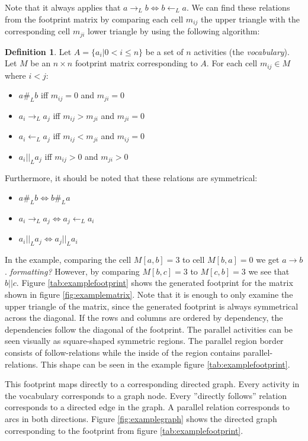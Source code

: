 \documentclass[english,12pt,a4paper,pdftex,sci,utf8]{aaltothesis}
\theoremstyle{definition}
\newtheorem{definition}{Definition}
\newcommand{\nyi}[1]{\noindent\colorbox{nyibg}{\textcolor{nyitext}{\emph{#1}}}}
\begin{document}
Note that it always applies that $a \rightarrow_L b \Leftrightarrow b \leftarrow_L a$.
We can find these relations from the footprint matrix by comparing each cell $m_{ij}$ the upper triangle with the corresponding cell $m_{ji}$ lower triangle by using the following algorithm:

\begin{definition}
Let $A = \{ a_i | 0 < i \le n \}$ be a set of $n$ activities (the \emph{vocabulary}).
Let $M$ be an $n \times n$ footprint matrix corresponding to $A$.
For each cell $m_{ij} \in M$ where $i < j$:
\begin{itemize}
    \item $a \#_L b$ iff $m_{ij} = 0$ and $m_{ji} = 0$
    \item $a_i \rightarrow_L a_j$ iff $m_{ij} > m_{ji}$ and $m_{ji} = 0$
    \item $a_i \leftarrow_L a_j$ iff $m_{ij} < m_{ji}$ and $m_{ij} = 0$
    \item $a_i ||_L a_j$ iff $m_{ij} > 0$ and $m_{ji} > 0$
\end{itemize}
Furthermore, it should be noted that these relations are symmetrical:
\begin{itemize}
    \item $a \#_L b \Leftrightarrow b \#_L a$ 
    \item $a_i \rightarrow_L a_j \Leftrightarrow a_j \leftarrow_L a_i$
    \item $a_i ||_L a_j \Leftrightarrow a_j ||_L a_i$ 
\end{itemize}
\label{def:logrelations}
\end{definition}

In the example, comparing the cell $M[a,b] = 3$ to cell $M[b,a] = 0$ we get $a \rightarrow b$. \nyi{formatting?}
However, by comparing $M[b,c] = 3$ to $M[c,b] = 3$ we see that $b || c$. 
Figure \ref{tab:examplefootprint} shows the generated footprint for the matrix shown in figure \ref{fig:examplematrix}.
Note that it is enough to only examine the upper triangle of the matrix, since the generated footprint is always symmetrical across the diagonal.
If the rows and columns are ordered by dependency, the dependencies follow the diagonal of the footprint.
The parallel activities can be seen visually as square-shaped symmetric regions.
The parallel region border consists of follow-relations while the inside of the region contains parallel-relations.
This shape can be seen in the example figure \ref{tab:examplefootprint}.

This footprint maps directly to a corresponding directed graph.
Every activity in the vocabulary corresponds to a graph node.
Every ''directly follows'' relation corresponds to a directed edge in the graph. A parallel relation corresponds to arcs in both directions.
Figure \ref{fig:examplegraph} shows the directed graph corresponding to the footprint from figure \ref{tab:examplefootprint}.
\end{document}
